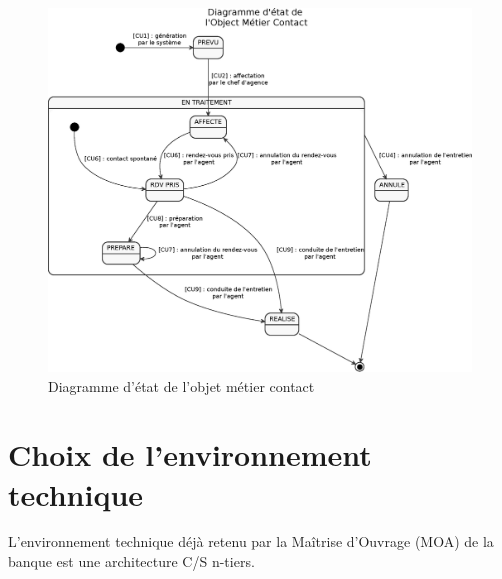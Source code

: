 \begin{figure}[H]
\centering
\includegraphics[width=\textwidth]{figures/eps/diag_etats_contact}
\caption{Diagramme d'état de l'objet métier contact}
\end{figure}

\section{Choix  de  l’environnement  technique}
L’environnement  technique  déjà  retenu  par  la 
Maîtrise d’Ouvrage (MOA) de la banque est une architecture C/S n-tiers. 